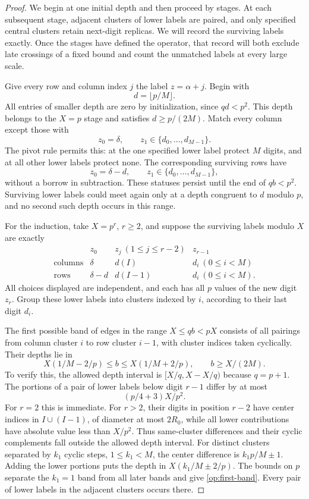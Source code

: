 \begin{proof}
We begin at one initial depth and then proceed by stages. At each
subsequent stage, adjacent clusters of lower labels are paired,
and only specified central clusters retain next-digit replicas.
We will record the surviving
labels exactly. Once the stages have defined the operator, that
record will both exclude late crossings of a fixed bound and count
the unmatched labels at every large scale.

Give every row and column index $j$ the label $z=\alpha+j$.
Begin with
\[
 d=\lfloor p/M\rfloor.
\]
All entries of smaller depth are zero by initialization, since
$qd<p^2$. This depth belongs to the $X=p$ stage and satisfies
$d\ge p/(2M)$. Match every column except those with
\[
 z_0=\delta,\qquad z_1\in\{d_0,\ldots,d_{M-1}\}.
\]
The pivot rule permits this: at the one specified lower label protect
$M$ digits, and at all other lower labels protect none. The corresponding
surviving rows have
\[
 z_0=\delta-d,\qquad z_1\in\{d_0,\ldots,d_{M-1}\},
\]
without a borrow in subtraction. These statuses persist until the end
of $qb<p^2$. Surviving lower labels could meet again only at a depth
congruent to $d$ modulo $p$, and no second such depth occurs in this
range.

For the induction, take $X=p^r$, $r\ge2$, and suppose the surviving
labels modulo $X$ are exactly
\begin{equation}
\begin{array}{c|ccc}
 &z_0&z_j\ (1\le j\le r-2)&z_{r-1}\\ \hline
 \text{columns}&\delta&d(I)&d_i\ (0\le i<M)\\
 \text{rows}&\delta-d&d(I-1)&d_i\ (0\le i<M).
\end{array}
\label{op:induction}
\end{equation}
All choices displayed are independent, and each has all $p$ values of
the new digit $z_r$. Group these lower labels into clusters indexed by
$i$, according to their last digit $d_i$.

The first possible band of edges in the range $X\le qb<pX$ consists
of all pairings from column cluster $i$ to row cluster $i-1$, with
cluster indices taken cyclically. Their depths lie in
\begin{equation}
 X(1/M-2/p)\le b\le X(1/M+2/p),
 \qquad b\ge X/(2M).
 \label{op:first-band}
\end{equation}
To verify this, the allowed depth interval is
$[X/q,X-X/q)$ because $q=p+1$. The portions of a pair of lower labels
below digit $r-1$ differ by at most
\[
 (p/4+3)X/p^2.
\]
For $r=2$ this is immediate. For $r>2$, their digits in position $r-2$
have center indices in $I\cup(I-1)$, of diameter at most $2R_0$,
while all lower contributions have absolute value less than $X/p^2$.
Thus same-cluster differences and their cyclic complements fall
outside the allowed depth interval. For distinct clusters separated by
$k_1$ cyclic steps, $1\le k_1<M$, the center difference is
$k_1p/M\pm1$. Adding the lower portions puts the depth in
$X(k_1/M\pm2/p)$. The bounds on $p$ separate the $k_1=1$ band from all
later bands and give \eqref{op:first-band}. Every pair of lower labels
in the adjacent clusters occurs there.


\end{proof}
